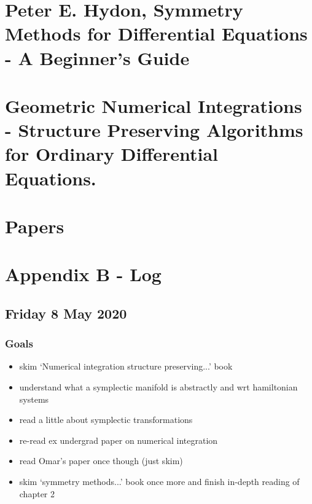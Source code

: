 \documentclass[12pt]{article}
\begin{document}




\newpage
\appendix

\section{Peter E. Hydon, Symmetry Methods for Differential Equations - A Beginner's Guide}

\section{Geometric Numerical Integrations - Structure Preserving Algorithms for Ordinary Differential Equations.}

\section{Papers}

\section{Appendix B - Log}

\subsection{Friday 8 May 2020}
\subsubsection{Goals}
\begin{itemize}
    \item skim `Numerical integration structure preserving...' book
    \item understand what a symplectic manifold is abstractly and wrt hamiltonian systems
    \item read a little about symplectic transformations
    \item re-read ex undergrad paper on numerical integration
    \item read Omar's paper once though (just skim)
    \item skim `symmetry methods...' book once more and finish in-depth reading of chapter 2
\end{itemize}
\end{document}

